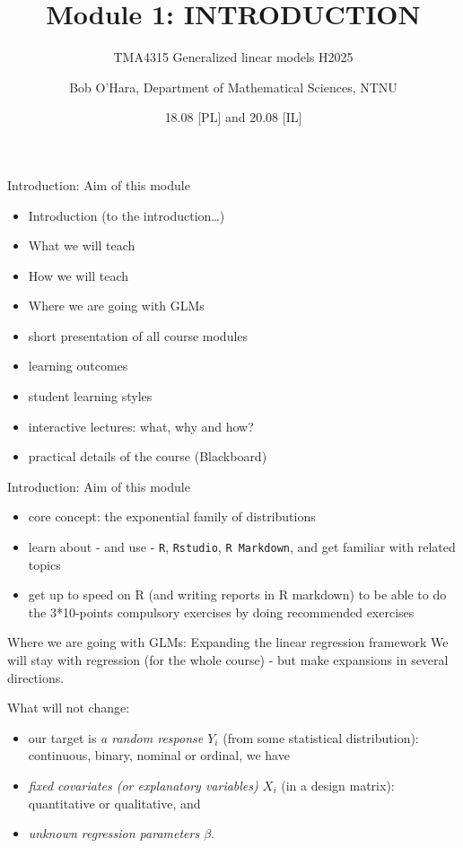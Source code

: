 \documentclass[
  ignorenonframetext,
]{beamer}
\title{Module 1: INTRODUCTION}
\subtitle{TMA4315 Generalized linear models H2025}
\author{Bob O'Hara, Department of Mathematical Sciences, NTNU}
\date{18.08 {[}PL{]} and 20.08 {[}IL{]}}
\providecommand{\tightlist}{%
  \setlength{\itemsep}{0pt}\setlength{\parskip}{0pt}}
\begin{document}
\frame{\titlepage}

\begin{frame}{Introduction: Aim of this module}
\label{introduction-aim-of-this-module}
\begin{itemize}
\item
  Introduction (to the introduction\ldots)
\item
  What we will teach
\item
  How we will teach
\item
  Where we are going with GLMs
\item
  short presentation of all course modules
\item
  learning outcomes
\item
  student learning styles
\item
  interactive lectures: what, why and how?
\item
  practical details of the course (Blackboard)
\end{itemize}
\end{frame}

\begin{frame}[fragile]{Introduction: Aim of this module}
\label{introduction-aim-of-this-module-1}
\begin{itemize}
\tightlist
\item
  core concept: the exponential family of distributions
\item
  learn about - and use - \texttt{R}, \texttt{Rstudio},
  \texttt{R\ Markdown}, and get familiar with related topics
\item
  get up to speed on R (and writing reports in R markdown) to be able to
  do the 3*10-points compulsory exercises by doing recommended exercises
\end{itemize}
\end{frame}

\begin{frame}
\begin{block}{Where we are going with GLMs: Expanding the linear
regression framework}
\label{where-we-are-going-with-glms-expanding-the-linear-regression-framework}
We will stay with regression (for the whole course) - but make
expansions in several directions.

What will not change:

\begin{itemize}
\item
  our target is \emph{a random response \(Y_i\)} (from some statistical
  distribution): continuous, binary, nominal or ordinal, we have
\item
  \emph{fixed covariates (or explanatory variables) \(X_i\)} (in a
  design matrix): quantitative or qualitative, and
\item
  \emph{unknown regression parameters \(\beta\)}.
\end{itemize}
\end{block}
\end{frame}
\end{document}
